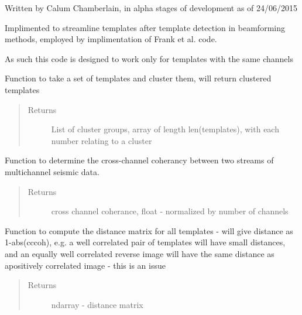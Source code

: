 \documentclass[a4paper,10pt,english]{sphinxmanual}
\begin{document}
Written by Calum Chamberlain, in alpha stages of development as of 24/06/2015

Implimented to streamline templates after template detection in beamforming
methods, employed by implimentation of Frank et al. code.

As such this code is designed to work only for templates with the same channels

\begin{fulllineitems}
\label{modules:clustering.cluster}
Function to take a set of templates and cluster them, will return clustered
templates
\begin{quote}\begin{description}
\item[{Returns}] \leavevmode
List of cluster groups, array of length len(templates), with
each number relating to a cluster

\end{description}\end{quote}

\end{fulllineitems}


\begin{fulllineitems}
\label{modules:clustering.cross_chan_coherance}
Function to determine the cross-channel coherancy between two streams of
multichannel seismic data.
\begin{quote}\begin{description}
\item[{Returns}] \leavevmode
cross channel coherance, float - normalized by number of channels

\end{description}\end{quote}

\end{fulllineitems}


\begin{fulllineitems}
\label{modules:clustering.distance_matrix}
Function to compute the distance matrix for all templates - will give
distance as 1-abs(cccoh), e.g. a well correlated pair of templates will
have small distances, and an equally well correlated reverse image will
have the same distance as apositively correlated image - this is an issue
\begin{quote}\begin{description}
\item[{Returns}] \leavevmode
ndarray - distance matrix

\end{description}\end{quote}

\end{fulllineitems}
\end{document}
